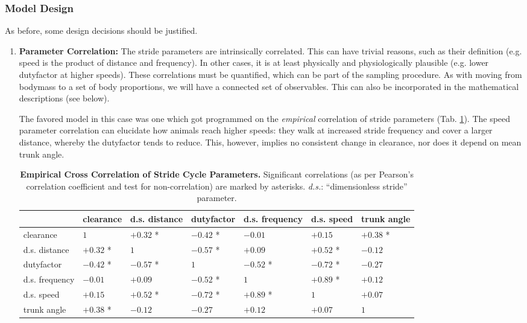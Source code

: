 \subsubsection{Model Design}
\label{sec:org554cfcf}
As before, some design decisions should be justified.

\begin{enumerate}
\item \textbf{Parameter Correlation:}
\label{sec:orgccc0e5d}
The stride parameters are intrinsically correlated.
This can have trivial reasons, such as their definition (e.g. speed is the product of distance and frequency).
In other cases, it is at least physically and physiologically plausible (e.g. lower dutyfactor at higher speeds).
These correlations must be quantified, which can be part of the sampling procedure.
As with moving from bodymass to a set of body proportions, we will have a connected set of observables.
This can also be incorporated in the mathematical descriptions (see below).

The favored model in this case was one which got programmed on the \emph{empirical} correlation of stride parameters (Tab. \ref{tab:stridecorrelation}).
The speed parameter correlation can elucidate how animals reach higher speeds: they walk at increased stride frequency and cover a larger distance, whereby the dutyfactor tends to reduce.
This, however, implies no consistent change in clearance, nor does it depend on mean trunk angle.

\begin{table}[p]
\caption{\label{tab:stridecorrelation}\textbf{Empirical Cross Correlation of Stride Cycle Parameters.} Significant correlations (as per Pearson's correlation coefficient and test for non-correlation) are marked by asterisks. \emph{d.s.}: ``dimensionless stride'' parameter.}
\centering
\begin{footnotesize}
\begin{tabular}{lllllll}
 & clearance & d.s. distance & dutyfactor & d.s. frequency & d.s. speed & trunk angle\\[0pt]
\hline
clearance & \(1\) & \(+0.32\) * & \(-0.42\) * & \(-0.01\) & \(+0.15\) & \(+0.38\) *\\[0pt]
d.s. distance & \(+0.32\) * & \(1\) & \(-0.57\) * & \(+0.09\) & \(+0.52\) * & \(-0.12\)\\[0pt]
dutyfactor & \(-0.42\) * & \(-0.57\) * & \(1\) & \(-0.52\) * & \(-0.72\) * & \(-0.27\)\\[0pt]
d.s. frequency & \(-0.01\) & \(+0.09\) & \(-0.52\) * & \(1\) & \(+0.89\) * & \(+0.12\)\\[0pt]
d.s. speed & \(+0.15\) & \(+0.52\) * & \(-0.72\) * & \(+0.89\) * & \(1\) & \(+0.07\)\\[0pt]
trunk angle & \(+0.38\) * & \(-0.12\) & \(-0.27\) & \(+0.12\) & \(+0.07\) & \(1\)\\[0pt]
\end{tabular}
\end{footnotesize}
\end{table}




\end{enumerate}
